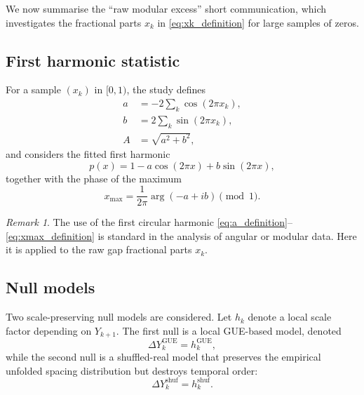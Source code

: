\documentclass[11pt]{amsart}
\numberwithin{equation}{section}
\theoremstyle{plain}
\theoremstyle{definition}
\theoremstyle{remark}
\newtheorem{remark}[theorem]{Remark}
\begin{document}
We now summarise the ``raw modular excess'' short communication,
which investigates the fractional parts $x_k$ in \eqref{eq:xk_definition}
for large samples of zeros.

\subsection{First harmonic statistic}
\label{subsec:first_harmonic_statistic}

For a sample $(x_k)$ in $[0,1)$, the study defines
\begin{align}
a &= -2 \sum_k \cos(2\pi x_k),
\label{eq:a_definition}\\
b &= 2 \sum_k \sin(2\pi x_k),
\label{eq:b_definition}\\
A &= \sqrt{a^2 + b^2},
\label{eq:A_definition}
\end{align}
and considers the fitted first harmonic
\begin{equation}
p(x) = 1 - a\cos(2\pi x) + b\sin(2\pi x),
\label{eq:p_x_definition}
\end{equation}
together with the phase of the maximum
\begin{equation}
x_{\max} = \frac{1}{2\pi} \arg(-a + i b) \pmod{1}.
\label{eq:xmax_definition}
\end{equation}

\begin{remark}
\label{rem:first_harmonic_standard}
The use of the first circular harmonic
\eqref{eq:a_definition}--\eqref{eq:xmax_definition}
is standard in the analysis of angular or modular data.
Here it is applied to the raw gap fractional parts $x_k$.
\end{remark}

\subsection{Null models}
\label{subsec:null_models}

Two scale-preserving null models are considered.
Let $h_k$ denote a local scale factor depending on $Y_{k+1}$.
The first null is a local GUE-based model,
denoted
\begin{equation}
\Delta Y_k^{\mathrm{GUE}} = h_k^{\mathrm{GUE}},
\label{eq:gue_null_definition}
\end{equation}
while the second null is a shuffled-real model that preserves
the empirical unfolded spacing distribution but destroys temporal order:
\begin{equation}
\Delta Y_k^{\mathrm{shuf}} = h_k^{\mathrm{shuf}}.
\label{eq:shuf_null_definition}
\end{equation}
\end{document}
